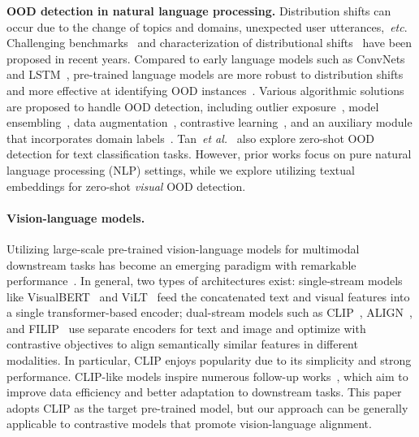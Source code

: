 \documentclass{article}
\def\etc{\emph{etc}}
\begin{document}
\noindent\textbf{OOD detection in natural language processing.} Distribution shifts can occur due to the change of topics and domains, unexpected user utterances,~\etc. {Challenging}
benchmarks~\cite{koh2021wilds} and characterization of distributional shifts~\cite{arora-etal-2021-types} {have been} proposed in recent years.  Compared to early language models such as ConvNets and LSTM~\cite{hochreiter1997long}, pre-trained language models are more robust to distribution shifts and more effective at identifying OOD instances~\cite{hendrycks-etal-2020-pretrained,Podolskiy21,xu-etal-2021-unsupervised}. Various algorithmic solutions are proposed to handle OOD detection, including outlier exposure~\cite{hu2021uncertainty}, model ensembling~\cite{lietal2021kfolden}, data augmentation~\cite{chen2021gold, zhan2021out, zheng2020out}, contrastive learning~\cite{jin2022towards,zhou2021contrastive}, and an auxiliary module that incorporates domain labels~\cite{shen2021enhancing}. Tan~\emph{et al.}~\cite{Tan2019OutofDomainDF} also explore zero-shot OOD detection for text classification tasks. However, prior works focus on pure natural language processing (NLP) settings, while we explore utilizing textual embeddings for zero-shot \emph{visual} OOD detection.

\paragraph{Vision-language models.} Utilizing large-scale pre-trained vision-language models for multimodal downstream tasks has become an emerging paradigm with remarkable performance~\cite{gu2020self,uppal2022multimodal}. In general, two types of architectures exist: single-stream models like VisualBERT~\cite{li2019visualbert} and ViLT~\cite{kim2021vilt}
{feed the concatenated text and visual features}
into a single transformer-based encoder; dual-stream models such as CLIP~\cite{radford2021learning}, ALIGN~\cite{jia2021scaling}, and FILIP~\cite{yao2021filip} use separate encoders for text and image and optimize with contrastive objectives to align semantically similar features in different modalities. In particular, CLIP enjoys popularity due to its simplicity and strong performance. CLIP-like models inspire numerous follow-up works~\cite{li2021supervision,zhang2021tip,zhou2022cocoop}, which aim to improve data efficiency and better adaptation to downstream tasks. This paper adopts CLIP as the target pre-trained model, but our approach can be generally applicable to contrastive models that promote vision-language alignment.
\end{document}
